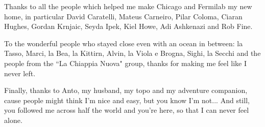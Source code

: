 \documentclass[letterpaper,12pt]{yalephd}
\begin{document}
Thanks to all the people which helped me make Chicago and Fermilab my new home, in particular David Caratelli,  Mateus Carneiro, Pilar Coloma, Ciaran Hughes, Gordan Krnjaic, Seyda Ipek, Kiel Howe, Adi Ashkenazi and Rob Fine.

To the wonderful people who stayed close even with an ocean in between: la Tasso, Marci, la Bea, la Kittirn, Alvin, la Viola e Brogna, Sighi, la Secchi and the people from the ``La Chiappia Nuova" group, thanks for making me feel like I never left.

Finally, thanks to Anto, my husband, my topo and my adventure companion, cause people might think I'm nice and easy, but you know I'm not... And still, you followed me across half the world and you're here, so that I can never feel alone.



\mainmatter










\appendix









\backmatter
{}


%
\end{document}
